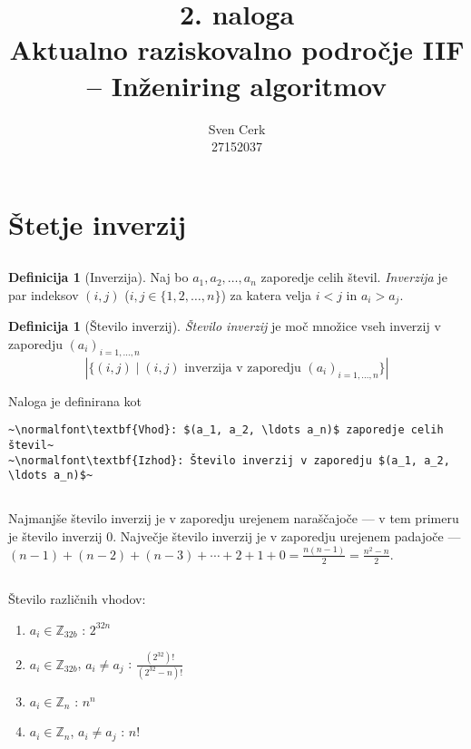 \documentclass[11pt,a4paper]{article}
\title{2. naloga \\ \normalsize Aktualno raziskovalno področje IIF -- Inženiring algoritmov}
\author{Sven Cerk\\27152037}
\theoremstyle{plain}
\theoremstyle{definition}
\newtheorem{definition}[theorem]{Definicija}
\begin{document}
\maketitle

\section{Štetje inverzij}

\subsection{} 

\begin{definition}[Inverzija]
Naj bo $a_1, a_2, \ldots, a_n$ zaporedje celih števil. \emph{Inverzija} je par indeksov $(i,j)$ ($i,j \in \{1,2,\ldots,n\}$) za katera velja $i < j$ in $a_i > a_j$.
\end{definition}

\begin{definition}[Število inverzij]
\emph{Število inverzij} je moč množice vseh inverzij v zaporedju $(a_i)_{i = 1,\ldots,n}$
\[
\left| \{ (i,j) \mid \text{$(i,j)$ inverzija v zaporedju $(a_i)_{i = 1,\ldots,n}$} \} \right|
\]
\end{definition}

Naloga je definirana kot
\begin{lstlisting}[escapechar=~]
~\normalfont\textbf{Vhod}: $(a_1, a_2, \ldots a_n)$ zaporedje celih števil~
~\normalfont\textbf{Izhod}: Število inverzij v zaporedju $(a_1, a_2, \ldots a_n)$~
\end{lstlisting}

\subsection{}

Najmanjše število inverzij je v zaporedju urejenem naraščajoče --- v tem primeru je število inverzij 0. Največje število inverzij je v zaporedju urejenem padajoče --- $(n-1) + (n-2) + (n-3) + \cdots + 2 + 1 + 0 = \frac{n (n-1)}{2} = \frac{n^2 - n}{2}$.

\subsection{}

Število različnih vhodov:
\begin{enumerate}[label=\alph*)]
\item $a_i \in \mathbb{Z}_{32b}$ : $2^{32n}$
\item $a_i \in \mathbb{Z}_{32b}$, $a_i \neq a_j$ : $\frac{(2^{32})!}{(2^{32} - n)!}$
\item $a_i \in \mathbb{Z}_{n}$ : $n^n$
\item $a_i \in \mathbb{Z}_{n}$, $a_i \neq a_j$ : $n!$
\end{enumerate}
\end{document}
